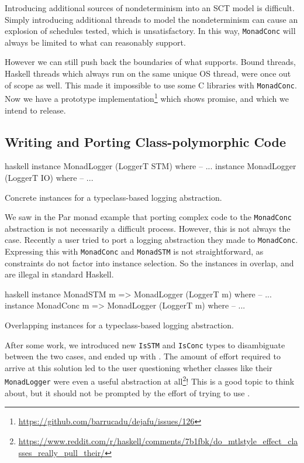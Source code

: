Introducing additional sources of nondeterminism into an SCT model is
difficult.  Simply introducing additional threads to model the
nondeterminism can cause an explosion of schedules tested, which is
unsatisfactory.  In this way, \verb|MonadConc| will always be limited
to what \dejafu{} can reasonably support.

However we can still push back the boundaries of what \dejafu{} supports.
Bound threads, Haskell threads which always run on the same unique OS
thread, were once out of scope as well.  This made it impossible to
use some C libraries with \verb|MonadConc|.  Now we have a prototype
implementation\footnote{\url{https://github.com/barrucadu/dejafu/issues/126}}
which shows promise, and which we intend to release.

\subsection{Writing and Porting Class-polymorphic Code}

\begin{listing}
\centering
\begin{cminted}{haskell}
instance MonadLogger (LoggerT STM) where -- ...
instance MonadLogger (LoggerT IO) where -- ...
\end{cminted}
\caption{Concrete instances for a typeclass-based logging abstraction.}\label{lst:mlogger1}
\end{listing}

We saw in the Par monad example that porting complex code to the
\verb|MonadConc| abstraction is not necessarily a difficult process.
However, this is not always the case.  Recently a user tried to port a
logging abstraction they made to \verb|MonadConc|.  Expressing this
with \verb|MonadConc| and \verb|MonadSTM| is not straightforward, as
constraints do not factor into instance selection.  So the instances
in  overlap, and are illegal in standard Haskell.

\begin{listing}
\centering
\begin{cminted}{haskell}
instance MonadSTM  m => MonadLogger (LoggerT m) where -- ...
instance MonadConc m => MonadLogger (LoggerT m) where -- ...
\end{cminted}
\caption{Overlapping instances for a typeclass-based logging abstraction.}\label{lst:mlogger2}
\end{listing}

After some work, we introduced new \verb|IsSTM| and \verb|IsConc|
types to disambiguate between the two cases, and ended up with
.  The amount of effort required to arrive at this
solution led to the user questioning whether classes like their
\verb|MonadLogger| were even a useful abstraction at
all\footnote{\url{https://www.reddit.com/r/haskell/comments/7b1fbk/do_mtlstyle_effect_classes_really_pull_their/}}!
This is a good topic to think about, but it should not be prompted by
the effort of trying to use \dejafu{}.


